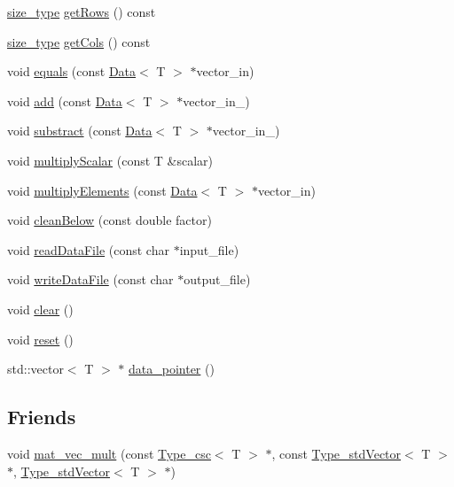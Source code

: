 \begin{DoxyCompactItemize}
\item 
\hyperlink{lmx__mat__data_8h_a49b489a408a211a90e766329c0732d7b}{size\-\_\-type} \hyperlink{classlmx_1_1Type__stdVector_adbbad4029937203d528c2f267174ea3c}{get\-Rows} () const 
\item 
\hyperlink{lmx__mat__data_8h_a49b489a408a211a90e766329c0732d7b}{size\-\_\-type} \hyperlink{classlmx_1_1Type__stdVector_adbc15d4db8a1f72e044a3250359e18eb}{get\-Cols} () const 
\item 
void \hyperlink{classlmx_1_1Type__stdVector_a7f24603798a29e4d13c0a9eae926ba04}{equals} (const \hyperlink{classlmx_1_1Data}{Data}$<$ T $>$ $\ast$vector\-\_\-in)
\item 
void \hyperlink{classlmx_1_1Type__stdVector_accae3e1fa0fd9cc7b5968a3bf73034fa}{add} (const \hyperlink{classlmx_1_1Data}{Data}$<$ T $>$ $\ast$vector\-\_\-in\-\_)
\item 
void \hyperlink{classlmx_1_1Type__stdVector_a7b246366659974874a46bf0424b3fd99}{substract} (const \hyperlink{classlmx_1_1Data}{Data}$<$ T $>$ $\ast$vector\-\_\-in\-\_)
\item 
void \hyperlink{classlmx_1_1Type__stdVector_a026f616e7a626ab3935f90779b06d36e}{multiply\-Scalar} (const T \&scalar)
\item 
void \hyperlink{classlmx_1_1Type__stdVector_a7bc99c10ee6a2905f7705598459f0101}{multiply\-Elements} (const \hyperlink{classlmx_1_1Data}{Data}$<$ T $>$ $\ast$vector\-\_\-in)
\item 
void \hyperlink{classlmx_1_1Type__stdVector_a85e5d2f3e6c22b833c12c2c9bf45660f}{clean\-Below} (const double factor)
\item 
void \hyperlink{classlmx_1_1Type__stdVector_a9147f2967ac55a22a91640297292d240}{read\-Data\-File} (const char $\ast$input\-\_\-file)
\item 
void \hyperlink{classlmx_1_1Type__stdVector_a96f2117b28cbc706f7cefe5ae7ad29e6}{write\-Data\-File} (const char $\ast$output\-\_\-file)
\item 
void \hyperlink{classlmx_1_1Type__stdVector_a304e1ed1b42ba622aa92b3308a445e18}{clear} ()
\item 
void \hyperlink{classlmx_1_1Type__stdVector_a8ee5888fe6b8f8e7225332e51833631c}{reset} ()
\item 
std\-::vector$<$ T $>$ $\ast$ \hyperlink{classlmx_1_1Type__stdVector_a935f6ffefa138befa766872afa16bba4}{data\-\_\-pointer} ()
\end{DoxyCompactItemize}
\subsection*{Friends}
\begin{DoxyCompactItemize}
\item 
void \hyperlink{classlmx_1_1Type__stdVector_aaf433432afb39beb3a3908942731530e}{mat\-\_\-vec\-\_\-mult} (const \hyperlink{classlmx_1_1Type__csc}{Type\-\_\-csc}$<$ T $>$ $\ast$, const \hyperlink{classlmx_1_1Type__stdVector}{Type\-\_\-std\-Vector}$<$ T $>$ $\ast$, \hyperlink{classlmx_1_1Type__stdVector}{Type\-\_\-std\-Vector}$<$ T $>$ $\ast$)
\end{DoxyCompactItemize}


